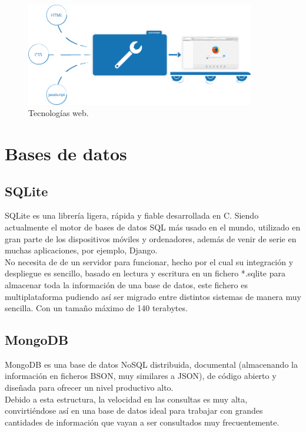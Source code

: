 \documentclass[11pt,a4paper]{book}
\begin{document}
				\begin{figure}[H]
					\centering
					\includegraphics[width=10cm, keepaspectratio]{img/html_css_js.png}
					\caption{Tecnologías web.}
					\label{fig:HTML_CSS_JS}
				\end{figure}
				
				
		\section{Bases de datos}
			\subsection{SQLite}
				SQLite es una librería ligera, rápida y fiable desarrollada en C. Siendo actualmente el motor de bases de datos SQL más usado en el mundo, utilizado en gran parte de los dispositivos móviles y ordenadores, además de venir de serie en muchas aplicaciones, por ejemplo, Django.\\
				
				
				No necesita de de un servidor para funcionar, hecho por el cual su integración y despliegue es sencillo, basado en lectura y escritura en un fichero *.sqlite para almacenar toda la información de una base de datos, este fichero es multiplataforma pudiendo así ser migrado entre distintos sistemas de manera muy sencilla. Con un tamaño máximo de 140 terabytes.
				
			\subsection{MongoDB}
				MongoDB es una base de datos NoSQL distribuida, documental (almacenando la información en ficheros BSON, muy similares a JSON), de código abierto y diseñada para ofrecer un nivel productivo alto.\\
				
				Debido a esta estructura, la velocidad en las consultas es muy alta, convirtiéndose así en una base de datos ideal para trabajar con grandes cantidades de información que vayan a ser consultados muy frecuentemente.\\
				
\end{document}
